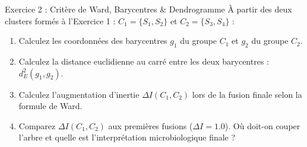 \documentclass[11pt,a4paper]{article}
\begin{document}
\begin{exercicebox}{Exercice 2 : Critère de Ward, Barycentres \& Dendrogramme}
À partir des deux clusters formés à l'Exercice 1 : $C_1 = \{S_1, S_2\}$ et $C_2 = \{S_3, S_4\}$ :
\begin{enumerate}[label=\textbf{\alph*.}]
  \item Calculez les coordonnées des barycentres $g_1$ du groupe $C_1$ et $g_2$ du groupe $C_2$.
  \item Calculez la distance euclidienne au carré entre les deux barycentres : $d_E^2(g_1, g_2)$.
  \item Calculez l'augmentation d'inertie $\Delta I(C_1, C_2)$ lors de la fusion finale selon la formule de Ward.
  \item Comparez $\Delta I(C_1, C_2)$ aux premières fusions ($\Delta I = 1.0$). Où doit-on couper l'arbre et quelle est l'interprétation microbiologique finale ?
\end{enumerate}
\end{exercicebox}
\end{document}

